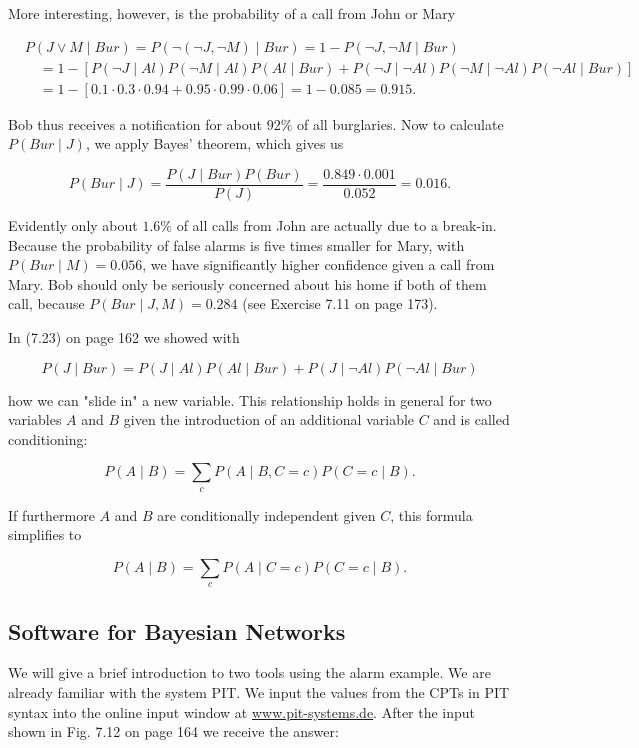 \documentclass[10pt]{book}
\begin{document}
More interesting, however, is the probability of a call from John or Mary

$$
\begin{aligned}
& P(J \vee M \mid Bur)=P(\neg(\neg J, \neg M) \mid Bur)=1-P(\neg J, \neg M \mid Bur) \\
& \quad=1-[P(\neg J \mid Al) P(\neg M \mid Al) P(Al \mid Bur)+P(\neg J \mid \neg Al) P(\neg M \mid \neg Al) P(\neg Al \mid Bur)] \\
& \quad=1-[0.1 \cdot 0.3 \cdot 0.94+0.95 \cdot 0.99 \cdot 0.06]=1-0.085=0.915 .
\end{aligned}
$$

Bob thus receives a notification for about $92 \%$ of all burglaries. Now to calculate $P(Bur \mid J)$, we apply Bayes' theorem, which gives us

$$
P(Bur \mid J)=\frac{P(J \mid Bur) P(Bur)}{P(J)}=\frac{0.849 \cdot 0.001}{0.052}=0.016 .
$$

Evidently only about $1.6 \%$ of all calls from John are actually due to a break-in. Because the probability of false alarms is five times smaller for Mary, with $P(Bur \mid M)=0.056$, we have significantly higher confidence given a call from Mary. Bob should only be seriously concerned about his home if both of them call, because $P(Bur \mid J, M)=0.284$ (see Exercise 7.11 on page 173).

In (7.23) on page 162 we showed with

$$
P(J \mid Bur)=P(J \mid Al) P(Al \mid Bur)+P(J \mid \neg Al) P(\neg Al \mid Bur)
$$

how we can "slide in" a new variable. This relationship holds in general for two variables $A$ and $B$ given the introduction of an additional variable $C$ and is called conditioning:

$$
P(A \mid B)=\sum_{c} P(A \mid B, C=c) P(C=c \mid B) .
$$

If furthermore $A$ and $B$ are conditionally independent given $C$, this formula simplifies to

$$
P(A \mid B)=\sum_{c} P(A \mid C=c) P(C=c \mid B) .
$$

\subsection{Software for Bayesian Networks}
We will give a brief introduction to two tools using the alarm example. We are already familiar with the system PIT. We input the values from the CPTs in PIT syntax into the online input window at \href{http://www.pit-systems.de}{www.pit-systems.de}. After the input shown in Fig. 7.12 on page 164 we receive the answer:
\end{document}

